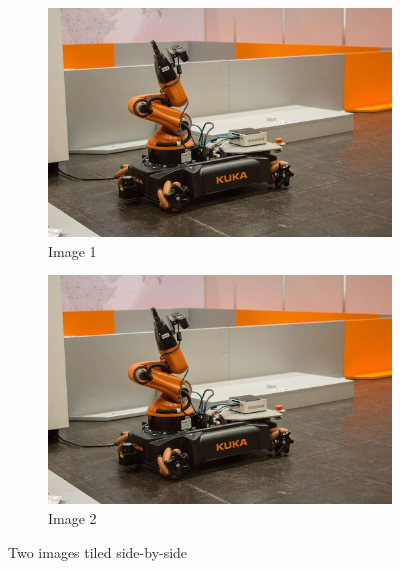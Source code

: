\begin{figure}[ht]
        \centering
        \begin{subfigure}[b]{0.45\linewidth}
            \centering
            \includegraphics[width=\linewidth]{images/sec2/youbot_with_arm.png}
            \caption{Image 1}
        \end{subfigure}
        \hfill
        \begin{subfigure}[b]{0.45\linewidth}
            \centering
            \includegraphics[width=\linewidth]{images/sec2/youbot_with_arm.png}
            \caption{Image 2}
        \end{subfigure}
        \caption{Two images tiled side-by-side}
\end{figure}